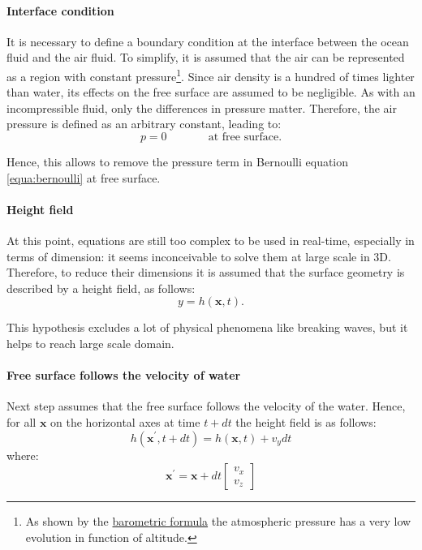 \documentclass[11pt]{article}
\begin{document}
\paragraph{Interface condition}
It is necessary to define a boundary condition at the interface between the ocean fluid and the air fluid.
To simplify, it is assumed that the air can be represented as a region with constant pressure\footnote{As shown by the \href{https://en.wikipedia.org/wiki/Barometric_formula}{barometric formula} the atmospheric pressure has a very low evolution in function of altitude.}.
Since air density is a hundred of times lighter than water, its effects on the free surface are assumed to be negligible.
As with an incompressible fluid, only the differences in pressure matter.
Therefore, the air pressure is defined as an arbitrary constant, leading to:
\begin{equation}
	p = 0\text{~~~~~~~~~~~at free surface.}
\end{equation}

Hence, this allows to remove the pressure term in Bernoulli equation \ref{equa:bernoulli} at free surface.

\paragraph{Height field}
At this point, equations are still too complex to be used in real-time, especially in terms of dimension:
it seems inconceivable to solve them at large scale in 3D.
Therefore, to reduce their dimensions it is assumed that the surface geometry is described by a height field, as follows:
\begin{equation}
	y = h(\mathbf x, t).
\end{equation}

This hypothesis excludes a lot of physical phenomena like breaking waves, but it helps to reach large scale domain.

\paragraph{Free surface follows the velocity of water}
Next step assumes that the free surface follows the velocity of the water.
Hence, for all $\mathbf x$ on the horizontal axes at time $t + dt$ the height field is as follows:
\begin{equation}
	h(\mathbf{x^{\prime}}, t + dt) = h(\mathbf x, t) + {v_y}dt\label{equa:freeSurfaceFollowWater0}
\end{equation}
where:
\begin{equation}
	\mathbf{x^{\prime}} = \mathbf x + dt\left[\begin{array}{c}v_x\\ v_z\end{array}\right]
	\label{equa:freeSurfaceFollowWater1}
\end{equation}
\end{document}
